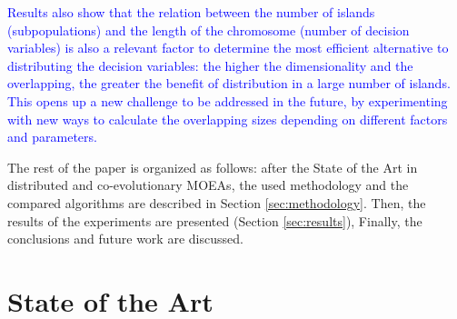 \documentclass[preprint]{elsarticle}
\begin{document}
\textcolor{blue}{Results also show that the relation between the number of islands (subpopulations) and the length of the chromosome (number of decision variables) is also a relevant factor to determine the most efficient alternative to \textcolor{blue}{distributing} the decision variables: the higher the dimensionality and the overlapping, the greater the benefit of distribution in a large number of islands. This opens up a new challenge to be addressed in the future, by experimenting with new ways to calculate the overlapping sizes depending \textcolor{blue}{on} different factors and parameters.}

The rest of the paper is organized as follows: after the State of the Art in distributed and co-evolutionary MOEAs, 
the used methodology and the compared algorithms are described in Section \ref{sec:methodology}. 
Then, the results of the experiments are presented (Section \ref{sec:results}), Finally, the conclusions and future work are discussed.


%
\section{State of the Art}
\label{sec:soa}
\end{document}

